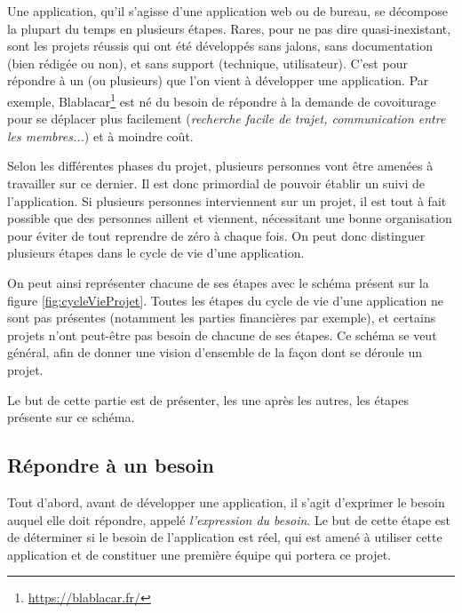 
Une application, qu'il s'agisse d'une application web ou de bureau, se décompose la plupart du temps en plusieurs étapes. Rares, pour ne pas dire quasi-inexistant, sont les projets réussis qui ont été développés sans jalons, sans documentation (bien rédigée ou non), et sans support (technique, utilisateur). C'est pour répondre à un (ou plusieurs) que l'on vient à développer une application. Par exemple, Blablacar\footnote{\url{https://blablacar.fr/}} est né du besoin de répondre à la demande de covoiturage pour se déplacer plus facilement (\emph{recherche facile de trajet, communication entre les membres...}) et à moindre coût.

Selon les différentes phases du projet, plusieurs personnes vont être amenées à travailler sur ce dernier. Il est donc primordial de pouvoir établir un suivi de l'application. Si plusieurs personnes interviennent sur un projet, il est tout à fait possible que des personnes aillent et viennent, nécessitant une bonne organisation pour éviter de tout reprendre de zéro à chaque fois. On peut donc distinguer plusieurs étapes dans le cycle de vie d'une application.

On peut ainsi représenter chacune de ses étapes avec le schéma présent sur la figure \ref{fig:cycleVieProjet}. Toutes les étapes du cycle de vie d'une application ne sont pas présentes (notamment les parties financières par exemple), et certains projets n'ont peut-être pas besoin de chacune de ses étapes. Ce schéma se veut général, afin de donner une vision d'ensemble de la façon dont se déroule un projet.

Le but de cette partie est de présenter, les une après les autres, les étapes présente sur ce schéma.


\subsection{Répondre à un besoin}

Tout d'abord, avant de développer une application, il s'agit d'exprimer le besoin auquel elle doit répondre, appelé \emph{l'expression du besoin}. Le but de cette étape est de déterminer si le besoin de l'application est réel, qui est amené à utiliser cette application et de constituer une première équipe qui portera ce projet.

